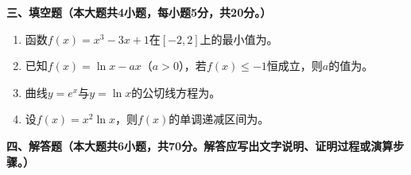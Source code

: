 \documentclass[12pt, a4paper]{ctexart}
\newcommand{\blank}[1]{\underline{\hspace{#1}}}
\begin{document}
\noindent\textbf{三、填空题（本大题共4小题，每小题5分，共20分。）}

\begin{enumerate}[start=13]
\item 函数$f(x)=x^3-3x+1$在$[-2,2]$上的最小值为\blank{3cm}。

\item 已知$f(x)=\ln x-ax$（$a>0$），若$f(x)\leq -1$恒成立，则$a$的值为\blank{3cm}。

\item 曲线$y=e^x$与$y=\ln x$的公切线方程为\blank{4cm}。

\item 设$f(x)=x^2\ln x$，则$f(x)$的单调递减区间为\blank{3cm}。
\end{enumerate}

\vspace{1em}

\noindent\textbf{四、解答题（本大题共6小题，共70分。解答应写出文字说明、证明过程或演算步骤。）}
\end{document}

